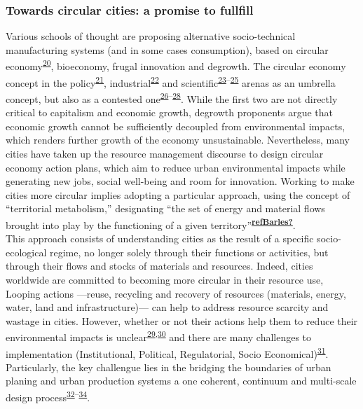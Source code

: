 \documentclass[
  12pt,
  a4paperpaper,
  onecolumn]{article}
\begin{document}
\hypertarget{towards-circular-cities-a-promise-to-fullfill}{%
\subsubsection{Towards circular cities: a promise to
fullfill}\label{towards-circular-cities-a-promise-to-fullfill}}

Various schools of thought are proposing alternative socio-technical
manufacturing systems (and in some cases consumption), based on circular
economy\textsuperscript{\protect\hyperlink{ref-Murray2017}{20}},
bioeconomy, frugal innovation and degrowth. The circular economy concept
in the policy\textsuperscript{\protect\hyperlink{ref-EC2015}{21}},
industrial\textsuperscript{\protect\hyperlink{ref-EllenMacArthurFoundation2015}{22}}
and
scientific\textsuperscript{\protect\hyperlink{ref-nobre2021}{23}--\protect\hyperlink{ref-Schoggl2020}{25}}
arenas as an umbrella concept, but also as a contested
one\textsuperscript{\protect\hyperlink{ref-CalistoFriant2020}{26}--\protect\hyperlink{ref-corvellec2021}{28}}.
While the first two are not directly critical to capitalism and economic
growth, degrowth proponents argue that economic growth cannot be
sufficiently decoupled from environmental impacts, which renders further
growth of the economy unsustainable. Nevertheless, many cities have
taken up the resource management discourse to design circular economy
action plans, which aim to reduce urban environmental impacts while
generating new jobs, social well-being and room for innovation. Working
to make cities more circular implies adopting a particular approach,
using the concept of ``territorial metabolism,'' designating ``the set
of energy and material flows brought into play by the functioning of a
given
territory''\textsuperscript{\protect\hyperlink{ref-refBarles}{\textbf{refBarles?}}}.\\
This approach consists of understanding cities as the result of a
specific socio-ecological regime, no longer solely through their
functions or activities, but through their flows and stocks of materials
and resources. Indeed, cities worldwide are committed to becoming more
circular in their resource use, Looping actions ---reuse, recycling and
recovery of resources (materials, energy, water, land and
infrastructure)--- can help to address resource scarcity and wastage in
cities. However, whether or not their actions help them to reduce their
environmental impacts is
unclear\textsuperscript{\protect\hyperlink{ref-petit-boix2022}{29},\protect\hyperlink{ref-Petit-Boix2018}{30}}
and there are many challenges to implementation (Institutional,
Political, Regulatorial, Socio
Economical)\textsuperscript{\protect\hyperlink{ref-williams2019}{31}}.
Particularly, the key challengue lies in the bridging the boundaries of
urban planing and urban production systems a one coherent, continuum and
multi-scale design
process\textsuperscript{\protect\hyperlink{ref-Herrmann2020}{32}--\protect\hyperlink{ref-juraschek2022}{34}}.
\end{document}
